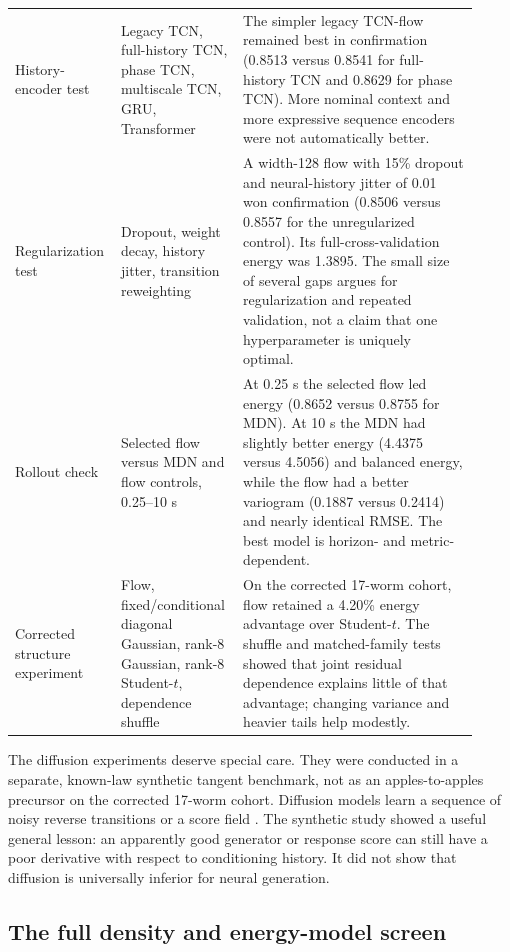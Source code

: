 \documentclass[11pt]{article}
\begin{document}
\begin{longtable}{p{0.18\linewidth}p{0.25\linewidth}p{0.49\linewidth}}
\addlinespace
History-encoder test & Legacy TCN, full-history TCN, phase TCN, multiscale TCN, GRU, Transformer & The simpler legacy TCN-flow remained best in confirmation (0.8513 versus 0.8541 for full-history TCN and 0.8629 for phase TCN). More nominal context and more expressive sequence encoders were not automatically better. \\
\addlinespace
Regularization test & Dropout, weight decay, history jitter, transition reweighting & A width-128 flow with 15\% dropout and neural-history jitter of 0.01 won confirmation (0.8506 versus 0.8557 for the unregularized control). Its full-cross-validation energy was 1.3895. The small size of several gaps argues for regularization and repeated validation, not a claim that one hyperparameter is uniquely optimal. \\
\addlinespace
Rollout check & Selected flow versus MDN and flow controls, 0.25--10 s & At 0.25 s the selected flow led energy (0.8652 versus 0.8755 for MDN). At 10 s the MDN had slightly better energy (4.4375 versus 4.5056) and balanced energy, while the flow had a better variogram (0.1887 versus 0.2414) and nearly identical RMSE. The best model is horizon- and metric-dependent. \\
\addlinespace
Corrected structure experiment & Flow, fixed/conditional diagonal Gaussian, rank-8 Gaussian, rank-8 Student-$t$, dependence shuffle & On the corrected 17-worm cohort, flow retained a 4.20\% energy advantage over Student-$t$. The shuffle and matched-family tests showed that joint residual dependence explains little of that advantage; changing variance and heavier tails help modestly. \\
\bottomrule
\end{longtable}

The diffusion experiments deserve special care. They were conducted in a separate, known-law synthetic tangent benchmark, not as an apples-to-apples precursor on the corrected 17-worm cohort. Diffusion models learn a sequence of noisy reverse transitions or a score field \citep{ho2020ddpm,song2021sde}. The synthetic study showed a useful general lesson: an apparently good generator or response score can still have a poor derivative with respect to conditioning history. It did not show that diffusion is universally inferior for neural generation.

\subsection{The full density and energy-model screen}
\end{document}
